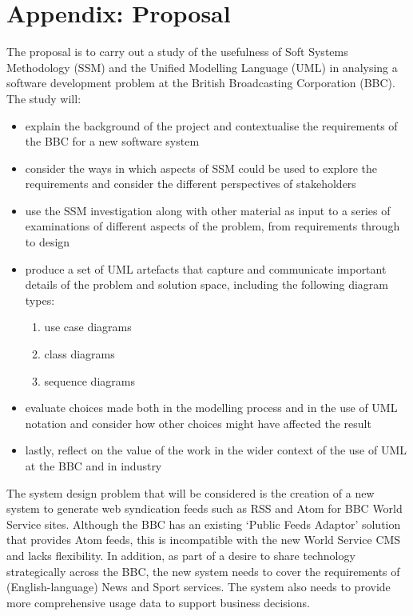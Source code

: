 \documentclass[a4paper]{article}
\begin{document}
\clearpage

\section{Appendix: Proposal}

The proposal is to carry out a study of the usefulness of Soft Systems Methodology (SSM) and the Unified Modelling Language (UML) in analysing a software development problem at the British Broadcasting Corporation (BBC). The study will:

\begin{itemize}
\item explain the background of the project and contextualise the requirements of the BBC for a new software system
\item consider the ways in which aspects of SSM could be used to explore the requirements and consider the different perspectives of stakeholders
\item use the SSM investigation along with other material as input to a series of examinations of different aspects of the problem, from requirements through to design
\item produce a set of UML artefacts that capture and communicate important details of the problem and solution space, including the following diagram types:
\begin{enumerate}
\item use case diagrams
\item class diagrams
\item sequence diagrams
\end{enumerate}
\item evaluate choices made both in the modelling process and in the use of UML notation and consider how other choices might have affected the result
\item lastly, reflect on the value of the work in the wider context of the use of UML at the BBC and in industry
\end{itemize}

The system design problem that will be considered is the creation of a new system to generate web syndication feeds such as RSS and Atom for BBC World Service sites. Although the BBC has an existing `Public Feeds Adaptor' solution that provides Atom feeds, this is incompatible with the new World Service CMS and lacks flexibility. In addition, as part of a desire to share technology strategically across the BBC, the new system needs to cover the requirements of (English-language) News and Sport services. The system also needs to provide more comprehensive usage data to support business decisions.
\end{document}
